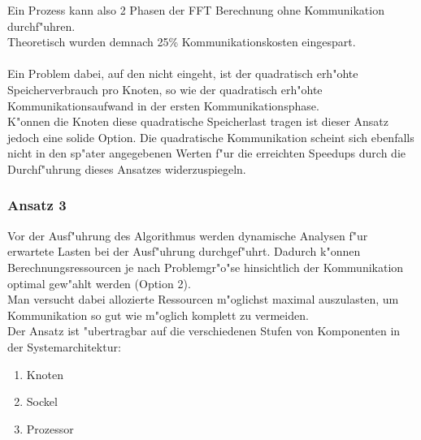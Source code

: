 Ein Prozess kann also 2 Phasen der FFT Berechnung ohne Kommunikation durchf"uhren.\\
Theoretisch wurden demnach 25\% Kommunikationskosten eingespart.\\
\\
Ein Problem dabei, auf den \cite{mainpaper} nicht eingeht, ist der quadratisch erh"ohte Speicherverbrauch pro Knoten, so wie der quadratisch erh"ohte Kommunikationsaufwand in der ersten Kommunikationsphase.\\
K"onnen die Knoten diese quadratische Speicherlast tragen ist dieser Ansatz jedoch eine solide Option. Die quadratische Kommunikation scheint sich ebenfalls nicht in den sp"ater angegebenen Werten f"ur die erreichten Speedups durch die Durchf"uhrung dieses Ansatzes widerzuspiegeln.

\subsubsection{Ansatz 3}
Vor der Ausf"uhrung des Algorithmus werden dynamische Analysen f"ur erwartete Lasten bei der Ausf"uhrung durchgef"uhrt. Dadurch k"onnen Berechnungsressourcen je nach Problemgr"o"se hinsichtlich der Kommunikation optimal gew"ahlt werden (Option 2).\\
Man versucht dabei allozierte Ressourcen m"oglichst maximal auszulasten, um Kommunikation so gut wie m"oglich komplett zu vermeiden.\\
Der Ansatz ist "ubertragbar auf die verschiedenen Stufen von Komponenten in der Systemarchitektur:
\begin{enumerate}
	\item Knoten
	\item Sockel
	\item Prozessor
\end{enumerate}


